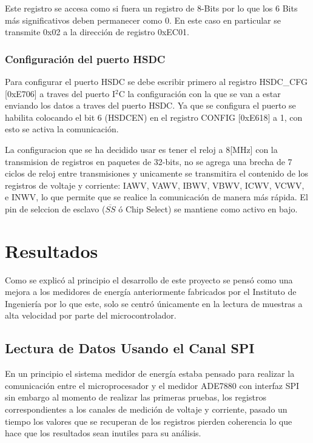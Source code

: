 \documentclass[letterpaper,12pt,oneside]{book}
\begin{document}
			Este registro se accesa como si fuera un registro de 8-Bits por lo que los 6 Bits más significativos deben permanecer como 0. En este caso en particular se transmite 0x02 a la dirección de registro 0xEC01.

			\subsection{Configuración del puerto HSDC}
			Para configurar el puerto HSDC se debe escribir primero al registro HSDC\_CFG [0xE706] a traves del puerto I$^2$C la configuración con la que se van a estar enviando los datos a traves del puerto HSDC. Ya que se configura el puerto se habilita colocando el bit 6 (HSDCEN) en el registro CONFIG [0xE618] a 1, con esto se activa la comunicación.

			La configuracion que se ha decidido usar es tener el reloj a 8[MHz] con la transmision de registros en paquetes de 32-bits, no se agrega una brecha de 7 ciclos de reloj entre transmisiones y unicamente se transmitira el contenido de los registros de voltaje y corriente: IAWV, VAWV, IBWV, VBWV, ICWV, VCWV, e INWV, lo que permite que se realice la comunicación de manera más rápida. El pin de selccion de esclavo ($\overline{SS}$ ó Chip Select) se mantiene como activo en bajo. %
	\chapter{Resultados}
	Como se explicó al principio el desarrollo de este proyecto se pensó como una mejora a los medidores de energía anteriormente fabricados por el Instituto de Ingeniería por lo que este, solo se centró únicamente en la lectura de muestras a alta velocidad por parte del microcontrolador.

		\section{Lectura de Datos Usando el Canal SPI}
		En un principio el sistema medidor de energía estaba pensado para realizar la comunicación entre el microprocesador y el medidor ADE7880 con interfaz SPI sin embargo al momento de realizar las primeras pruebas, los registros correspondientes a los canales de medición de voltaje y corriente, pasado un tiempo los valores que se recuperan de los registros pierden coherencia lo que hace que los resultados sean inutiles para su análisis.
\end{document}
